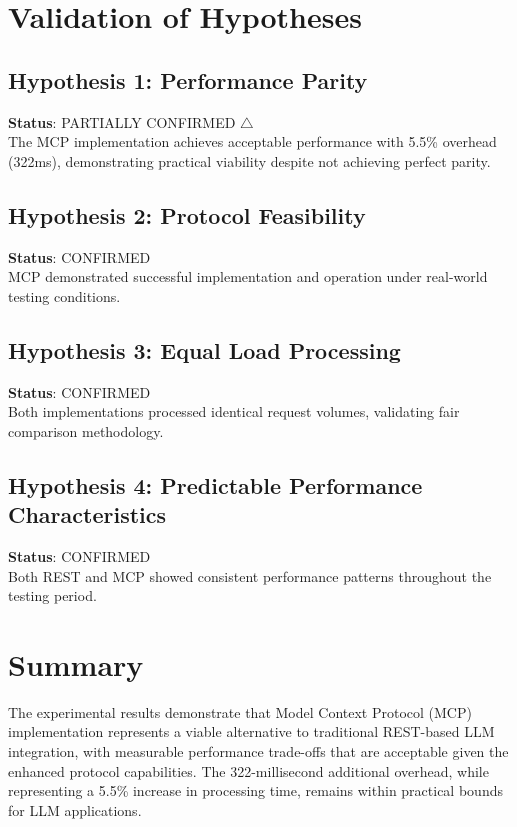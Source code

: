 \section{Validation of Hypotheses}

\subsection{Hypothesis 1: Performance Parity}

\textbf{Status}: PARTIALLY CONFIRMED $\triangle$ \\
The MCP implementation achieves acceptable performance with 5.5\% overhead (322ms), demonstrating practical viability despite not achieving perfect parity.

\subsection{Hypothesis 2: Protocol Feasibility}

\textbf{Status}: CONFIRMED \checkmark \\
MCP demonstrated successful implementation and operation under real-world testing conditions.

\subsection{Hypothesis 3: Equal Load Processing}

\textbf{Status}: CONFIRMED \checkmark \\
Both implementations processed identical request volumes, validating fair comparison methodology.

\subsection{Hypothesis 4: Predictable Performance Characteristics}

\textbf{Status}: CONFIRMED \checkmark \\
Both REST and MCP showed consistent performance patterns throughout the testing period.

\section{Summary}

The experimental results demonstrate that Model Context Protocol (MCP) implementation represents a viable alternative to traditional REST-based LLM integration, with measurable performance trade-offs that are acceptable given the enhanced protocol capabilities. The 322-millisecond additional overhead, while representing a 5.5\% increase in processing time, remains within practical bounds for LLM applications.

